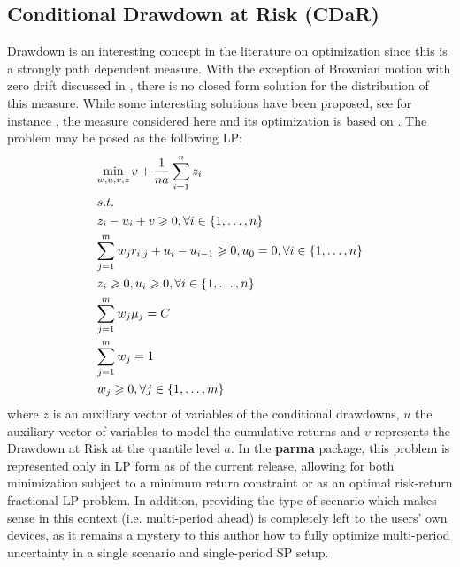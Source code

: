 \subsection{Conditional Drawdown at Risk (CDaR)}
Drawdown is an interesting concept in the literature on optimization since
this is a strongly path dependent measure. With the exception of Brownian
motion with zero drift discussed in \citet{Douady1999}, there is no
closed form solution for the distribution of this measure. While some
interesting solutions have been proposed, see for instance
\citet{Magdon-Ismail2004}, the measure considered here and its
optimization is based on \citet{Chekhlov2005}. The problem may be posed
as the following LP:
\begin{equation}
\begin{gathered}
  \mathop {\min }\limits_{w,u,v,z} v + \frac{1}{{na}}\sum\limits_{i=1}^n {{z_i}}  \hfill \\
  s.t. \hfill \\
  {z_i} - {u_i} + v \geqslant 0,\forall i \in \left\{ {1,\dots,n} \right\} \hfill \\
  \sum\limits_{j=1}^m {{w_j}{r_{i,j}} + {u_i} - {u_{i - 1}}}  \geqslant 0,{u_0}=0,\forall i \in \left\{ {1,\dots,n} \right\} \hfill \\
  {z_i} \geqslant 0,{u_i} \geqslant 0,\forall i \in \left\{ {1,\dots,n} \right\} \hfill \\
  \sum\limits_{j=1}^m {{w_j}{\mu _j}=C}  \hfill \\
  \sum\limits_{j=1}^m {{w_j}=1}  \hfill \\
  {w_j} \geqslant 0,\forall j \in \left\{ {1,\dots,m} \right\} \hfill \\
\end{gathered}
\end{equation}
where $z$ is an auxiliary vector of variables of the conditional drawdowns,
$u$ the auxiliary vector of variables to model the cumulative returns and
$v$ represents the Drawdown at Risk at the quantile level $a$. In the
\textbf{parma} package, this problem is represented only in LP form as of the
current release, allowing for both minimization subject to a minimum return
constraint or as an optimal risk-return fractional LP problem. In addition,
providing the type of scenario which makes sense in this context (i.e.
multi-period ahead) is completely left to the users' own devices, as it
remains a mystery to this author how to fully optimize multi-period
uncertainty in a single scenario and single-period SP setup.

